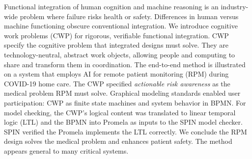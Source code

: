 Functional integration of human cognition and machine reasoning is an industry-wide problem where failure risks health or safety.
Differences in human versus machine functioning obscure conventional integration. 
We introduce cognitive work problems (CWP) for rigorous, verifiable functional integration. 
CWP specify the cognitive problem that integrated designs must solve. 
They are technology-neutral, abstract work objects, allowing people and computing to share and transform them in coordination.
The end-to-end method is illustrated on a system that employs AI for remote patient monitoring (RPM) during COVID-19 home care. 
The CWP specified \emph{actionable risk awareness} as the medical problem RPM must solve.
Graphical modeling standards enabled user participation: CWP as finite state machines and system behavior in BPMN. 
For model checking, the CWP’s logical content was translated to linear temporal logic (LTL) and the BPMN into Promela as inputs to the SPIN model checker. 
SPIN verified the Promela implements the LTL correctly.
We conclude the RPM design solves the medical problem and enhances patient safety. 
The method appears general to many critical systems.

